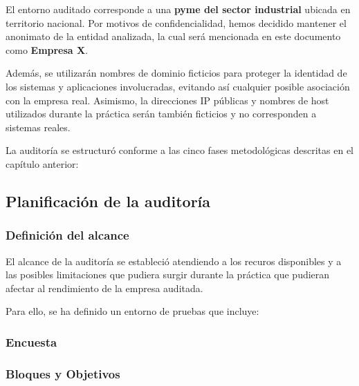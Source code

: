 \documentclass[a4paper, 10pt]{article}
\begin{document}
\par\vspace{0.4cm}

El entorno auditado corresponde a una \textbf{pyme del sector industrial} ubicada en territorio nacional. Por motivos de confidencialidad, hemos decidido mantener el anonimato de la entidad analizada, la cual será mencionada en este documento como \textbf{Empresa X}. 
\par\vspace{0.4cm}

Además, se utilizarán nombres de dominio ficticios para proteger la identidad de los sistemas y aplicaciones involucradas, evitando así cualquier posible asociación con la empresa real. Asimismo, la direcciones IP públicas y nombres de host utilizados durante la práctica serán también ficticios y no corresponden a sistemas reales.

\par\vspace{0.4cm}

La auditoría se estructuró conforme a las cinco fases metodológicas descritas en el capítulo anterior:


\subsection{Planificación de la auditoría}
\par\vspace{0.4cm}
\subsubsection*{Definición del alcance}

El alcance de la auditoría se estableció atendiendo a los recuros disponibles y a las posibles limitaciones que pudiera surgir durante la práctica que pudieran afectar al rendimiento de la empresa auditada.

Para ello, se ha definido un entorno de pruebas que incluye:

\par\vspace{0.4cm}

\subsubsection*{Encuesta}

\subsubsection*{Bloques y Objetivos}
\end{document}
